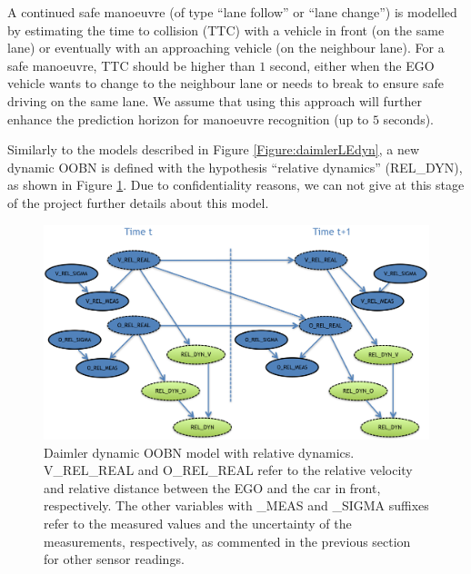 A continued safe manoeuvre (of type ``lane follow'' or ``lane change'') is modelled by estimating the time to collision (TTC) with a vehicle in front (on the same lane) or eventually with an approaching vehicle (on the neighbour lane). For a safe manoeuvre, TTC should be higher than $1$ second, either when the EGO vehicle wants to change to the neighbour lane or needs to break to ensure safe driving on the same lane. We assume that using this approach will further enhance the prediction horizon for manoeuvre recognition (up to $5$ seconds).

Similarly to the models described in Figure \ref{Figure:daimlerLEdyn}, a new dynamic OOBN is defined with the hypothesis ``relative dynamics'' (REL\_DYN), as shown in Figure \ref{Figure:daimlerreldyn}. Due to confidentiality reasons, we can not give at this stage of the project further details about this model. 

 
\begin{figure}[ht!]
\begin{center}
\includegraphics[scale=0.48]{./figures/Daimlerreldyn.png}
\end{center}
\caption{\label{Figure:daimlerreldyn}Daimler dynamic OOBN model with relative dynamics. V\_REL\_REAL and O\_REL\_REAL refer to the relative velocity and relative distance between the EGO and the car in front, respectively. The other variables with \_MEAS and \_SIGMA suffixes refer to the measured values and the uncertainty of the measurements, respectively, as commented in the previous section for other sensor readings.}
\end{figure}


